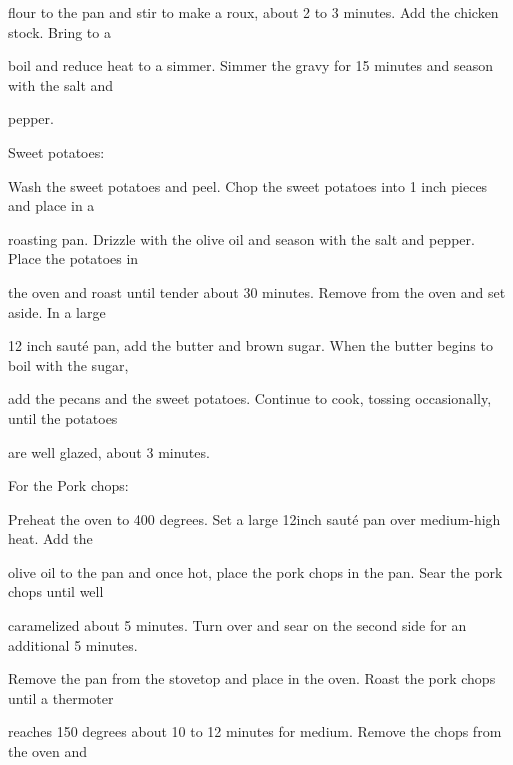 \documentclass[a4paper,portrait,12pt]{book}
\begin{document}
flour to the pan and stir to make a roux, about 2 to 3 minutes. Add the chicken stock. Bring to a




boil and reduce heat to a simmer. Simmer the gravy for 15 minutes and season with the salt and




pepper.




Sweet potatoes:




Wash the sweet potatoes and peel. Chop the sweet potatoes into 1 inch pieces and place in a




roasting pan. Drizzle with the olive oil and season with the salt and pepper. Place the potatoes in




the oven and roast until tender about 30 minutes. Remove from the oven and set aside. In a large




12 inch saut\'{e} pan, add the butter and brown sugar. When the butter begins to boil with the sugar,




add the pecans and the sweet potatoes. Continue to cook, tossing occasionally, until the potatoes




are well glazed, about 3 minutes.







For the Pork chops:




Preheat the oven to 400 degrees. Set a large 12inch saut\'{e} pan over medium-high heat. Add the




olive oil to the pan and once hot, place the pork chops in the pan. Sear the pork chops until well




caramelized about 5 minutes. Turn over and sear on the second side for an additional 5 minutes.




Remove the pan from the stovetop and place in the oven. Roast the pork chops until a thermoter




reaches 150 degrees about 10 to 12 minutes for medium. Remove the chops from the oven and
\end{document}
